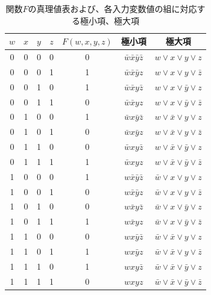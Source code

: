 \documentclass[10pt,dvipdfmx]{jsarticle}
\begin{document}
\begin{table}
\begin{center}
\caption{関数$F$の真理値表および、各入力変数値の組に対応する極小項、極大項}
\label{B}
\begin{tabular}{|cccc|c|c|c|} \hline
\textbf{$w$} & \textbf{$x$} & \textbf{$y$} & \textbf{$z$} & \textbf{$F(w,x,y,z)$} & \textbf{極小項} & \textbf{極大項} \\ \hline
0 & 0 & 0 & 0 & 0 & $\bar{w}\bar{x}\bar{y}\bar{z}$ & $w \lor x \lor y \lor z$  \\
0 & 0 & 0 & 1 & 1 & $\bar{w}\bar{x}\bar{y}z$ & $w \lor x \lor y \lor \bar{z}$  \\ 
0 & 0 & 1 & 0 & 1 & $\bar{w}\bar{x}y\bar{z}$ & $w \lor x \lor \bar{y} \lor z$  \\ 
0 & 0 & 1 & 1 & 0 & $\bar{w}\bar{x}yz$ & $w \lor x \lor \bar{y} \lor \bar{z}$  \\ 
0 & 1 & 0 & 0 & 1 & $\bar{w}x\bar{y}\bar{z}$ & $w \lor \bar{x} \lor y \lor z$  \\ 
0 & 1 & 0 & 1 & 0 & $\bar{w}x\bar{y}z$ & $w \lor \bar{x} \lor y \lor \bar{z}$  \\ 
0 & 1 & 1 & 0 & 0 & $\bar{w}xy\bar{z}$ & $w \lor \bar{x} \lor \bar{y} \lor z$  \\ 
0 & 1 & 1 & 1 & 1 & $\bar{w}xyz$ & $w \lor \bar{x} \lor \bar{y} \lor \bar{z}$  \\ 
1 & 0 & 0 & 0 & 1 & $w\bar{x}\bar{y}\bar{z}$ & $\bar{w} \lor x \lor y \lor z$  \\ 
1 & 0 & 0 & 1 & 0 & $w\bar{x}\bar{y}z$ & $\bar{w} \lor x \lor y \lor \bar{z}$  \\ 
1 & 0 & 1 & 0 & 0 & $w\bar{x}y\bar{z}$ & $\bar{w} \lor x \lor \bar{y} \lor z$  \\ 
1 & 0 & 1 & 1 & 1 & $w\bar{x}yz$ & $\bar{w} \lor x \lor \bar{y} \lor \bar{z}$  \\ 
1 & 1 & 0 & 0 & 0 & $wx\bar{y}\bar{z}$ & $\bar{w} \lor \bar{x} \lor y \lor z$  \\ 
1 & 1 & 0 & 1 & 1 & $wx\bar{y}z$ & $\bar{w} \lor \bar{x} \lor y \lor \bar{z}$  \\ 
1 & 1 & 1 & 0 & 1 & $wxy\bar{z}$ & $\bar{w} \lor \bar{x} \lor \bar{y} \lor z$  \\ 
1 & 1 & 1 & 1 & 0 & $wxyz$ & $\bar{w} \lor \bar{x} \lor \bar{y} \lor \bar{z}$  \\ \hline
\end{tabular}
\end{center}
\end{table}
\end{document}
